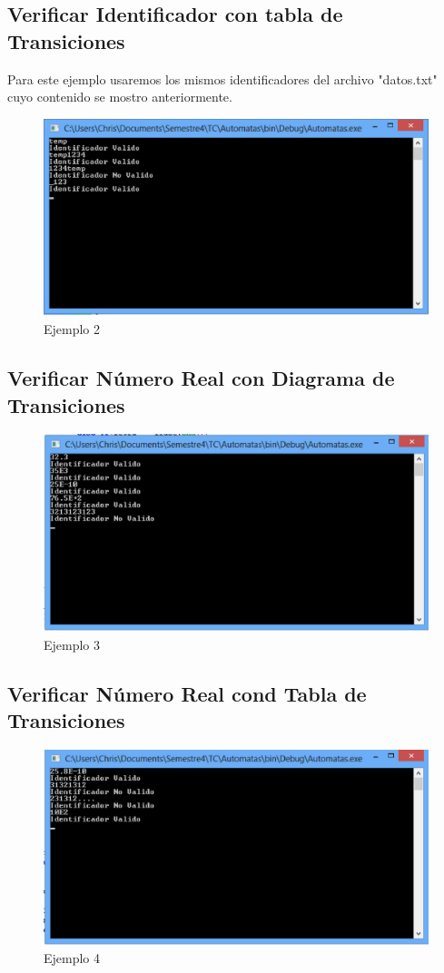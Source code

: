 \documentclass[a4paper,12pt]{article}
\begin{document}
\subsection{Verificar Identificador con tabla de Transiciones}

Para este ejemplo usaremos los mismos identificadores del archivo "datos.txt" cuyo contenido se mostro anteriormente.

\begin{figure}[h]
\centering
\includegraphics[scale=0.5]{imagenes/2.eps}
\caption{Ejemplo 2}
\end{figure}
\newpage

\subsection{Verificar Número Real con Diagrama de Transiciones}

\begin{figure}[h]
\centering
\includegraphics[scale=0.5]{imagenes/3.eps}
\caption{Ejemplo 3}
\end{figure}



\subsection{Verificar Número Real cond Tabla de Transiciones}

\begin{figure}[h]
\centering
\includegraphics[scale=0.5]{imagenes/4.eps}
\caption{Ejemplo 4}
\end{figure}
\end{document}
